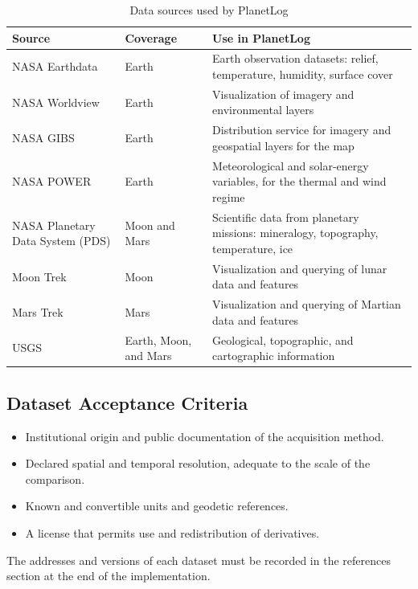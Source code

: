\documentclass[12pt,letterpaper]{article}
\begin{document}
\begin{table}[htbp]
\centering
\caption{Data sources used by PlanetLog}
\small
\begin{tabularx}{\textwidth}{>{\raggedright\arraybackslash}p{4.0cm} >{\raggedright\arraybackslash}p{2.6cm} >{\raggedright\arraybackslash}X}
\toprule
\textbf{Source} & \textbf{Coverage} & \textbf{Use in PlanetLog} \\
\midrule
NASA Earthdata & Earth & Earth observation datasets: relief, temperature, humidity, surface cover \\
NASA Worldview & Earth & Visualization of imagery and environmental layers \\
NASA GIBS & Earth & Distribution service for imagery and geospatial layers for the map \\
NASA POWER & Earth & Meteorological and solar-energy variables, for the thermal and wind regime \\
NASA Planetary Data System (PDS) & Moon and Mars & Scientific data from planetary missions: mineralogy, topography, temperature, ice \\
Moon Trek & Moon & Visualization and querying of lunar data and features \\
Mars Trek & Mars & Visualization and querying of Martian data and features \\
USGS & Earth, Moon, and Mars & Geological, topographic, and cartographic information \\
\bottomrule
\end{tabularx}
\end{table}

\subsection{Dataset Acceptance Criteria}

\begin{itemize}
  \item Institutional origin and public documentation of the acquisition method.
  \item Declared spatial and temporal resolution, adequate to the scale of the comparison.
  \item Known and convertible units and geodetic references.
  \item A license that permits use and redistribution of derivatives.
\end{itemize}

The addresses and versions of each dataset must be recorded in the references section at the end of the implementation.
\end{document}
